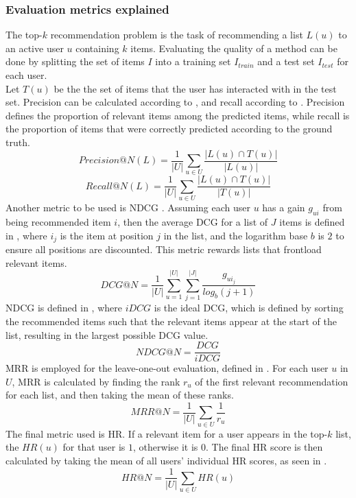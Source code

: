 \subsubsection*{Evaluation metrics explained}
The top-$k$ recommendation problem is the task of recommending a list $L(u)$ to an active user $u$ containing $k$ items.
Evaluating the quality of a method can be done by splitting the set of items $I$ into a training set $I_{train}$ and a test set $I_{test}$ for each user.
\\
Let $T(u)$ be the the set of items that the user has interacted with in the test set.
Precision can be calculated according to , and recall according to .
Precision defines the proportion of relevant items among the predicted items, while recall is the proportion of items that were correctly predicted according to the ground truth.
\begin{equation}
    \label{eqn:precision}
    Precision@N(L) = \frac{1}{|U|} \sum\limits_{u \in U}\frac{|L(u) \cap T(u)|}{|L(u)|}
\end{equation}
\begin{equation}
    \label{eqn:recall}
    Recall@N(L) = \frac{1}{|U|} \sum\limits_{u \in U} \frac{|L(u) \cap T(u)|}{|T(u)|}
\end{equation}
Another metric to be used is NDCG \cite{dcgpaper}.
Assuming each user $u$ has a gain $g_{ui}$ from being recommended item $i$, then the average DCG for a list of $J$ items is defined in , where $i_j$ is the item at position $j$ in the list, and the logarithm base $b$ is $2$ to ensure all positions are discounted.
This metric rewards lists that frontload relevant items.
\begin{equation}
    \label{eqn:dcg}
    DCG@N = \frac{1}{|U|} \sum\limits_{u=1}^{|U|} \sum\limits_{j = 1}^{|J|} \frac{g_{ui_j}}{log_b (j+1)}
\end{equation}
NDCG is defined in , where $iDCG$ is the ideal DCG, which is defined by sorting the recommended items such that the relevant items appear at the start of the list, resulting in the largest possible DCG value.
\begin{equation}
    \label{eqn:ndcg}
    NDCG@N = \frac{DCG}{iDCG}
\end{equation}
MRR \cite{MRR} is employed for the leave-one-out evaluation, defined in .
For each user $u$ in $U$, MRR is calculated by finding the rank $r_u$ of the first relevant recommendation for each list, and then taking the mean of these ranks.
\begin{equation}
    \label{eqn:mrr}
    MRR@N = \frac{1}{|U|} \sum\limits_{u \in U}\frac{1}{r_u}
\end{equation}
The final metric used is HR.
If a relevant item for a user appears in the top-$k$ list, the $HR(u)$ for that user is $1$, otherwise it is $0$.
The final HR score is then calculated by taking the mean of all users' individual HR scores, as seen in .
\begin{equation}
    \label{eqn:hr}
    HR@N = \frac{1}{|U|} \sum\limits_{u \in U}HR(u)
\end{equation}

